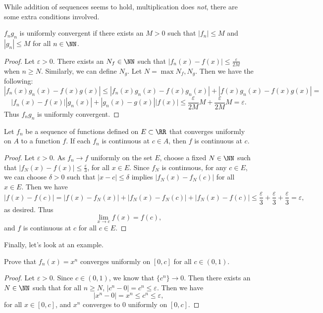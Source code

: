 While addition of sequences seems to hold, multiplication does \emph{not}, there are some extra conditions involved. 
\begin{proposition}
	$f_ng_n$ is uniformly convergent if there exists an $M > 0$ such that $|f_n| \leq M$ and $|g_n| \leq M$ for all $n \in \NN$. 
\end{proposition}
\begin{proof}
	Let $\varepsilon > 0$. There exists an $N_f \in \NN$ such that $|f_n(x) - f(x)| \leq \frac{\varepsilon}{2M}$ when $n \geq N$. Similarly, we can define $N_g$. Let $N = \max{N_f, N_g}$. Then we have the following:
	\[ |f_n(x)g_n(x) - f(x)g(x)| \leq |f_n(x)g_n(x) - f(x)g_n(x)| + |f(x)g_n(x) - f(x)g(x)| = \] \[ |f_n(x) - f(x)||g_n(x)| + |g_n(x) - g(x)||f(x)|  \leq \dfrac{\varepsilon}{2M}M + \dfrac{\varepsilon}{2M}M = \varepsilon. \]
Thus $f_ng_n$ is uniformly convergent. 
\end{proof}

\begin{theorem}
	Let $f_n$ be a sequence of functions defined on $E \subset \RR$ that converges uniformly on $A$ to a function $f$. If each $f_n$ is continuous at $c \in A$, then $f$ is continuous at $c$. 
\end{theorem}
\begin{proof}
	Let $\varepsilon > 0$. As $f_n \to f$ uniformly on the set $E$, choose a fixed $N \in \NN$ such that $|f_N(x) - f(x)| \leq \frac{\varepsilon}{3}$, for all $x \in E$. Since $f_N$ is continuous, for any $c \in E$, we can choose $\delta > 0$ such that $|x-c| \leq \delta$ implies $|f_N(x) - f_N(c)|$ for all $x \in E$. Then we have 
	\[ |f(x) - f(c)| = |f(x) - f_N(x)| + |f_N(x) - f_N(c)| + |f_N(x) - f(c)| \leq \frac{\varepsilon}{3} + \frac{\varepsilon}{3} + \frac{\varepsilon}{3} = \varepsilon, \] as desired. Thus \[ \lim_{x\to c} f(x) = f(c), \] and $f$ is continuous at $c$ for all $c \in E$. 
\end{proof}

Finally, let's look at an example. 
\begin{example}
	Prove that $f_n(x) = x^n$ converges uniformly on $[0, c]$ for all $c \in (0,1)$. 
\end{example}
\begin{proof}
	Let $\varepsilon > 0$. Since $c \in (0,1)$, we know that $\{c^n\} \to 0$. Then there exists an $N \in \NN$ such that for all $n \geq N$, $|c^n - 0| = c^n \leq \varepsilon$. Then we have 
	\[ |x^n - 0| = x^n \leq c^n \leq \varepsilon , \] for all $x \in [0,c]$, and $x^n$ converges to 0 uniformly on $[0,c]$. 
\end{proof}

